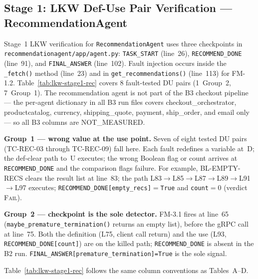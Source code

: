 \documentclass[sigconf,review,anonymous,balance=false]{acmart}
\begin{document}
\subsection{Stage 1: LKW Def-Use Pair Verification --- RecommendationAgent}
\label{sec:lkw-stage1-rec}

Stage~1 LKW verification for \texttt{RecommendationAgent} uses three checkpoints
in \texttt{recommendationagent/app/agent.py}: \texttt{TASK\_START} (line~26),
\texttt{RECOMMEND\_DONE} (line~91), and \texttt{FINAL\_ANSWER} (line~102).
Fault injection occurs inside the \texttt{\_fetch()} method (line~23) and in
\texttt{get\_recommendations()} (line~113) for FM-1.2.
Table~\ref{tab:lkw-stage1-rec} covers 8 fault-tested DU pairs (1~Group~2,
7~Group~1).
The recommendation agent is not part of the B3 checkout pipeline --- the
per-agent dictionary in all B3 run files covers
checkout\_orchestrator, productcatalog, currency, shipping\_quote, payment,
ship\_order, and email only --- so all B3 columns are NOT\_MEASURED.

\textbf{Group~1 --- wrong value at the use point.}
Seven of eight tested DU pairs (TC-REC-03 through TC-REC-09) fall here.
Each fault redefines a variable at~D; the def-clear path to~U executes;
the wrong Boolean flag or count arrives at \texttt{RECOMMEND\_DONE} and the
comparison flags failure.
For example, BL-EMPTY-RECS clears the result list at line~83;
the path L83$\to$L85$\to$L87$\to$L89$\to$L91$\to$L97 executes;
\texttt{RECOMMEND\_DONE[empty\_recs]}$=$\texttt{True} and
\texttt{count}$=0$ (verdict \textsc{Fail}).

\textbf{Group~2 --- checkpoint is the sole detector.}
FM-3.1 fires at line~65 (\texttt{maybe\_premature\_termination()} returns an
empty list), before the gRPC call at line~75.
Both the definition (L75, client call return) and the use (L93,
\texttt{RECOMMEND\_DONE[count]}) are on the killed path;
\texttt{RECOMMEND\_DONE} is absent in the B2 run.
\texttt{FINAL\_ANSWER[premature\_termination]=True} is the sole signal.

Table~\ref{tab:lkw-stage1-rec} follows the same column conventions as
Tables~A--D.
\end{document}
